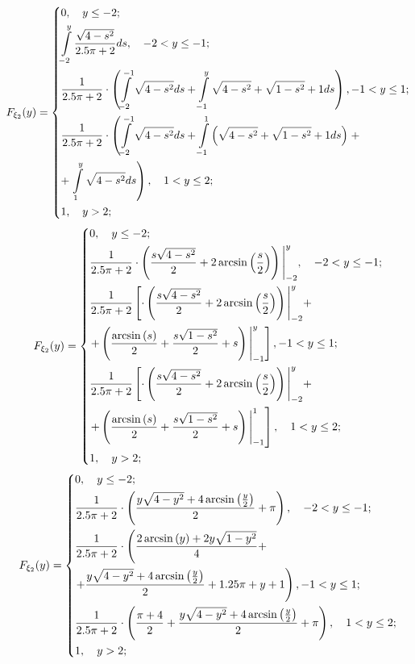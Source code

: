 \documentclass[14pt,a4paper]{scrartcl}
\theoremstyle{definition}
\theoremstyle{remark}
\theoremstyle{definition}
\theoremstyle{definition}
\begin{document}
$$
F_{\xi_2} (y) = \begin{dcases}
	0, \quad y \leq  -2;\\
	  \int\limits_{-2}^{ y}{ \dfrac{\sqrt{4 - s^2}}{2.5\pi + 2} ds}, \quad -2 < y \leq -1;\\
	\dfrac{1}{2.5\pi + 2} \cdot \left(\int\limits_{-2}^{ -1}{\sqrt{4 - s^2}  ds} + \int\limits_{-1}^{ y}{\sqrt{4 - s^2}+ \sqrt{1-s^2}+ 1 ds} \right),  -1 < y \leq 1; \\
			\dfrac{1}{2.5\pi + 2} \cdot \left(\int\limits_{-2}^{ -1}{\sqrt{4 - s^2}  ds} + \int\limits_{-1}^{ 1}{\left( \sqrt{4 - s^2}+ \sqrt{1-s^2}+ 1 ds \right) }\right. +\\+  \left. \int\limits_{1}^{ y}{\sqrt{4 - s^2}ds} \right), \quad 1 < y \leq 2;\\
			1, \quad y >  2;\\
\end{dcases}
$$
$$
F_{\xi_2} (y) = \begin{dcases}
	0, \quad y \leq  -2;\\
	 \dfrac{1}{2.5\pi + 2} \cdot \left( \dfrac{s\sqrt{4-s^2}}{2}+2\arcsin\left(\dfrac{s}{2}\right) \right)\Bigg|_{-2}^{y} , \quad -2 < y \leq -1;\\
	 \dfrac{1}{2.5\pi + 2} \left[ \cdot \left( \dfrac{s\sqrt{4-s^2}}{2}+2\arcsin\left(\dfrac{s}{2}\right) \right)\Bigg|_{-2}^{y} + \right.\\ \left. +\left( \dfrac{\arcsin\left(s\right)}{2}+\dfrac{s\sqrt{1-s^2}}{2}+s \right)\Bigg|_{-1}^{y}  \right] ,  -1 < y \leq 1; \\
	\dfrac{1}{2.5\pi + 2} \left[ \cdot \left( \dfrac{s\sqrt{4-s^2}}{2}+2\arcsin\left(\dfrac{s}{2}\right) \right)\Bigg|_{-2}^{y} + \right.\\ \left. +\left( \dfrac{\arcsin\left(s\right)}{2}+\dfrac{s\sqrt{1-s^2}}{2}+s \right)\Bigg|_{-1}^{1}  \right], \quad 1 < y \leq 2;\\
		1, \quad y >  2;\\
\end{dcases}
$$
$$
F_{\xi_2} (y) = \begin{dcases}
	0, \quad y \leq  -2;\\
	\dfrac{1}{2.5\pi + 2} \cdot \left( \dfrac{y\sqrt{4-y^2}+4\arcsin\left(\frac{y}{2}\right)}{2}+{\pi} \right) , \quad -2 < y \leq -1;\\
\dfrac{1}{2.5\pi + 2} \cdot \left( \dfrac{2\arcsin\left(y\right)+2y\sqrt{1-y^2}}{4} + \right. \\ \left. + \dfrac{y\sqrt{4-y^2}+4\arcsin\left(\frac{y}{2}\right)}{2}+1.25{\pi} + y + 1 \right) ,  -1 < y \leq 1; \\
		 	 \dfrac{1}{2.5\pi + 2} \cdot \left( \dfrac{{\pi}+4}{2} + \dfrac{y\sqrt{4-y^2}+4\arcsin\left(\frac{y}{2}\right)}{2}+{\pi} \right) , \quad 1 < y \leq 2;\\
		1, \quad y >  2;\\
\end{dcases}
$$
\end{document}
